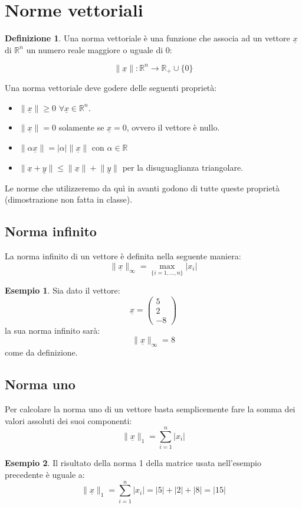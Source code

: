 \documentclass[12pt, a4paper]{book}
\theoremstyle{definition}
\newtheorem{exmp}{Esempio}[section]
\newtheorem{defn}{Definizione}[section]
\newcommand{\VarMtrx}[1]{\ensuremath{\underline{#1}}}
\begin{document}
\section{Norme vettoriali}
\begin{flushleft}
\begin{defn}
Una norma vettoriale è una funzione che associa ad un vettore \VarMtrx{x} di $\mathbb{R}^{n}$ un numero reale maggiore o uguale di 0: 

\[ \lVert \VarMtrx{x} \rVert:  \mathbb{R}^{n} \longrightarrow \mathbb{R}_{+} \cup \{0\} \]
\end{defn}
Una norma vettoriale deve godere delle seguenti proprietà: 
\begin{itemize}
	\item $\lVert \VarMtrx{x} \rVert \geq 0$ $\forall \VarMtrx{x} \in \mathbb{R}^{n}$.
	\item $\lVert \VarMtrx{x} \rVert = 0$ solamente se $\VarMtrx{x} = 0$, ovvero il vettore è nullo.
	\item $\lVert\alpha \VarMtrx{x}\rVert = |\alpha|\lVert\VarMtrx{x}\rVert$ con $\alpha \in \mathbb{R}$
	\item $\lVert \VarMtrx{x} + \VarMtrx{y}\rVert \leq \lVert \VarMtrx{x}\rVert + \lVert\VarMtrx{y}\rVert$ per la disuguaglianza triangolare.
\end{itemize}
Le norme che utilizzeremo da quì in avanti godono di tutte queste proprietà (dimostrazione non fatta in classe).  
\end{flushleft}

\subsection{Norma infinito}
\begin{flushleft}
La norma infinito di un vettore è definita nella seguente maniera: 
\[ \lVert\VarMtrx{x}\rVert_{\infty}  = \max_{\{i = 1,\dots,n\}} |x_{i}| \]

\begin{exmp}
Sia dato il vettore:
\[ \VarMtrx{x} = \begin{pmatrix} 5 \\ 2 \\ -8  \end{pmatrix} \]
la sua norma infinito sarà: 
\[ \lVert\VarMtrx{x}\rVert_{\infty}  = 8\]
come da definizione. 
\end{exmp}
\end{flushleft}

\subsection{Norma uno}
\begin{flushleft}
Per calcolare la norma uno di un vettore basta semplicemente fare la somma dei valori assoluti dei suoi componenti: 
\[ \lVert\VarMtrx{x}\rVert_{1}  =\sum_{i=1}^{n} |x_{i}| \]

\begin{exmp}
Il risultato della norma 1 della matrice usata nell'esempio precedente è uguale a: 
\[ \lVert\VarMtrx{x}\rVert_{1}  =\sum_{i=1}^{n} |x_{i}|  = |5| + |2| + |8| = |15| \]
\end{exmp}
\end{flushleft}
\end{document}
